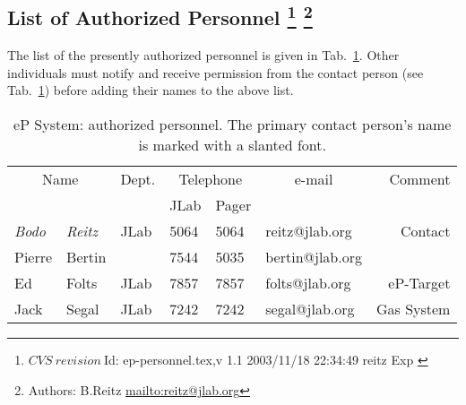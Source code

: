 \begin{safetyen}{0}{0}
\subsection[List of Authorized  Personnel]{List of Authorized  Personnel
\footnote{
   $CVS~revision~ $Id: ep-personnel.tex,v 1.1 2003/11/18 22:34:49 reitz Exp $ $
 }
\footnote{Authors: B.Reitz \url{mailto:reitz@jlab.org}}
}
\end{safetyen}
The list
of the presently authorized personnel is given in Tab.~\ref{tab:ep:personnel}.
Other individuals must notify and receive permission from
the contact person (see Tab.~\ref{tab:ep:personnel}) before adding their names 
to the above list.
\begin{table}[ht]
\begin{center}
\begin{tabular}{|ll|l|l|l|l|r|} \hline
  \multicolumn{2}{|c|}{Name} & Dept. & \multicolumn{2}{c|}{Telephone} & 
  \multicolumn{1}{c|}{e-mail} & Comment \\ 
  \cline{4-5}
   &  &   & JLab & Pager &  & \\ 
\hline
 {\em Bodo} & {\em Reitz}  & JLab    & 5064 & 5064 & reitz@jlab.org      & Contact     \\ 
 Pierre     & Bertin       &         & 7544 & 5035 & bertin@jlab.org &  \\ 
 Ed         & Folts        & JLab    & 7857 & 7857 & folts@jlab.org  &  eP-Target \\ 
 Jack       & Segal        & JLab    & 7242 & 7242 & segal@jlab.org  &  Gas System \\ 
\hline
\end{tabular}
\end{center}
\caption[eP System: authorized personnel]{
   eP System: authorized personnel. The primary contact person's
   name is marked with a slanted font. 
}
\label{tab:ep:personnel}
\end{table}

%
%
